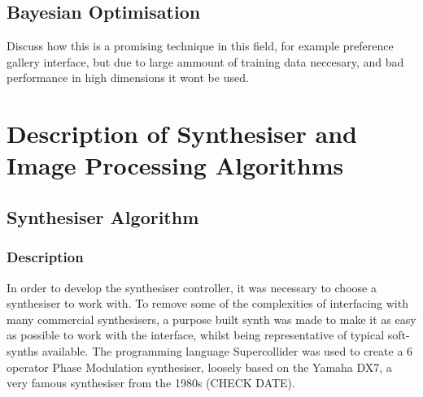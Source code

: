 \documentclass[11pt, oneside]{report}   	%
\begin{document}
\section{Bayesian Optimisation}
Discuss how this is a promising technique in this field, for example preference gallery interface, but due to large ammount of training data neccesary, and bad performance in high dimensions it wont be used.

\chapter{Description of Synthesiser and Image Processing Algorithms}
\section{Synthesiser Algorithm}
\subsection{Description}
In order to develop the synthesiser controller, it was necessary to choose a synthesiser to work with. To remove some of the complexities of interfacing with many commercial synthesisers, a purpose built synth was made to make it as easy as possible to work with the interface, whilst being representative of typical soft-synths available.
The programming language Supercollider was used to create a 6 operator Phase Modulation synthesiser, loosely based on the Yamaha DX7, a very famous synthesiser from the 1980s (CHECK DATE).
 
\end{document}
